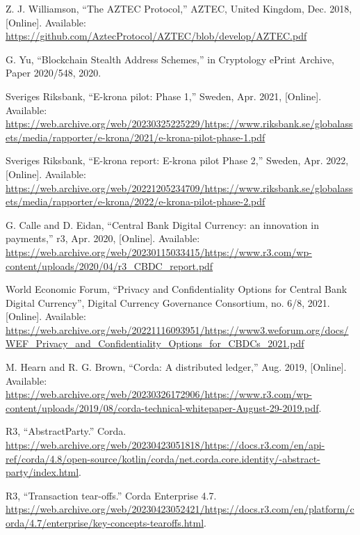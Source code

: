 \begin{enumerate}[leftmargin=0.75cm,label={[\arabic*]}]
  \item Z. J. Williamson, ``The AZTEC Protocol,'' AZTEC, United Kingdom, Dec. 2018, [Online]. Available: \url{https://github.com/AztecProtocol/AZTEC/blob/develop/AZTEC.pdf}

  \item G. Yu, ``Blockchain Stealth Address Schemes,'' in Cryptology ePrint Archive, Paper 2020/548, 2020.


\item Sveriges Riksbank, ``E-krona pilot: Phase 1,'' Sweden, Apr. 2021, [Online]. Available: \url{https://web.archive.org/web/20230325225229/https://www.riksbank.se/globalassets/media/rapporter/e-krona/2021/e-krona-pilot-phase-1.pdf}

  \item Sveriges Riksbank, ``E-krona report: E-krona pilot Phase 2,'' Sweden, Apr. 2022, [Online]. Available: \url{https://web.archive.org/web/20221205234709/https://www.riksbank.se/globalassets/media/rapporter/e-krona/2022/e-krona-pilot-phase-2.pdf}

 \item G. Calle and D. Eidan, ``Central Bank Digital Currency: an innovation in payments,'' r3, Apr. 2020, [Online]. Available: \url{https://web.archive.org/web/20230115033415/https://www.r3.com/wp-content/uploads/2020/04/r3_CBDC_report.pdf}

  \item World Economic Forum, ``Privacy and Confidentiality Options for Central Bank Digital Currency'', Digital Currency Governance Consortium, no. 6/8, 2021. [Online]. Available: \url{https://web.archive.org/web/20221116093951/https://www3.weforum.org/docs/WEF_Privacy_and_Confidentiality_Options_for_CBDCs_2021.pdf}

  \item M. Hearn and R. G. Brown, ``Corda: A distributed ledger,'' Aug. 2019, [Online]. Available: \url{https://web.archive.org/web/20230326172906/https://www.r3.com/wp-content/uploads/2019/08/corda-technical-whitepaper-August-29-2019.pdf}.

\item R3, ``AbstractParty.'' Corda. \url{https://web.archive.org/web/20230423051818/https://docs.r3.com/en/api-ref/corda/4.8/open-source/kotlin/corda/net.corda.core.identity/-abstract-party/index.html}.

\item R3, ``Transaction tear-offs.'' Corda Enterprise 4.7. \url{https://web.archive.org/web/20230423052421/https://docs.r3.com/en/platform/corda/4.7/enterprise/key-concepts-tearoffs.html}.


\end{enumerate}
